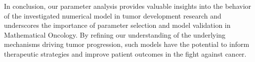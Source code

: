In conclusion, our parameter analysis provides valuable insights into the behavior of the investigated numerical model in tumor development research and underscores the importance of parameter selection and model validation in Mathematical Oncology. By refining our understanding of the underlying mechanisms driving tumor progression, such models have the potential to inform therapeutic strategies and improve patient outcomes in the fight against cancer.